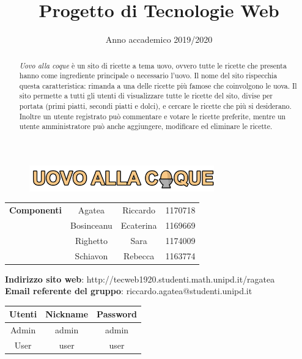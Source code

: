 
\title{Progetto di Tecnologie Web}
\author{}
\date{Anno accademico 2019/2020}


\maketitle
\begin{figure}[H]
	\centering
	\includegraphics[width=8cm]{img/logo.png}
\end{figure}
\begin{table}[H]
	\centering
	\begin{tabular}{c|c c c}
		\textbf{Componenti} & Agatea     & Riccardo  & 1170718 \\
		                    & Bosinceanu & Ecaterina & 1169669 \\
		                    & Righetto   & Sara      & 1174009 \\
		                    & Schiavon   & Rebecca   & 1163774 \\
	\end{tabular}
\end{table}

\begin{center}
	\textbf{Indirizzo sito web}: http://tecweb1920.studenti.math.unipd.it/ragatea\\
	\textbf{Email referente del gruppo}: riccardo.agatea@studenti.unipd.it
\end{center}

\begin{table}[H]
	\centering
	\begin{tabular}{c|c c}
		\textbf{Utenti} & \textbf{Nickname} & \textbf{Password} \\
		\hline
		Admin           & admin & admin             \\
		User            & user  & user              \\
	\end{tabular}
\end{table}
\newpage
{}
\tableofcontents
\newpage
{}
\renewcommand{\abstractname}{Abstract}
\begin{abstract}
	\emph{Uovo alla coque} è un sito di ricette a tema uovo, ovvero tutte le ricette che presenta hanno come ingrediente principale o necessario l'uovo. Il nome del sito rispecchia questa caratteristica: rimanda a una delle ricette più famose che coinvolgono le uova. \newline
	Il sito permette a tutti gli utenti di visualizzare tutte le ricette del sito, divise per portata (primi piatti, secondi piatti e dolci), e cercare le ricette che più si desiderano. Inoltre un utente registrato può commentare e votare le ricette preferite, mentre un utente amministratore può anche aggiungere, modificare ed eliminare le ricette.
\end{abstract}
\newpage

\newpage

\newpage

\newpage

\newpage



